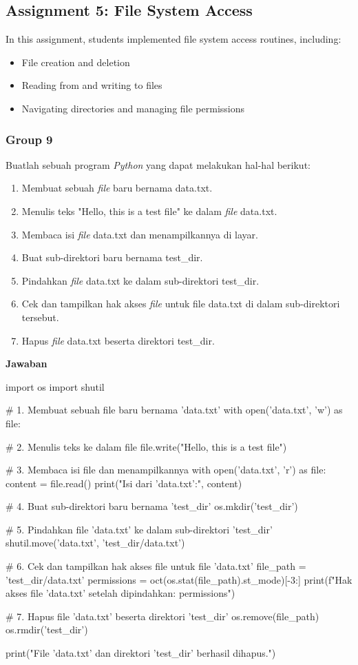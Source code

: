 \documentclass[12pt]{article}
\begin{document}
\subsection{Assignment 5: File System Access}
In this assignment, students implemented file system access routines, including:
\begin{itemize}
    \item File creation and deletion
    \item Reading from and writing to files
    \item Navigating directories and managing file permissions
\end{itemize}

\subsubsection{Group 9}
Buatlah sebuah program \textit{Python} yang dapat melakukan hal-hal berikut:
\begin{enumerate}
    \item Membuat sebuah \textit{file} baru bernama data.txt.
    \item Menulis teks "Hello, this is a test file" ke dalam \textit{file} data.txt.
    \item Membaca isi \textit{file} data.txt dan menampilkannya di layar.
    \item Buat sub-direktori baru bernama test_dir.
    \item Pindahkan \textit{file} data.txt ke dalam sub-direktori test_dir.
    \item Cek dan tampilkan hak akses \textit{file} untuk file data.txt di dalam sub-direktori tersebut.
    \item Hapus \textit{file} data.txt beserta direktori test_dir.
\end{enumerate}

\textbf{Jawaban}
\begin{python}
import os
import shutil

# 1. Membuat sebuah file baru bernama 'data.txt'
with open('data.txt', 'w') as file:

# 2. Menulis teks ke dalam file
file.write("Hello, this is a test file")

# 3. Membaca isi file dan menampilkannya
with open('data.txt', 'r') as file:
content = file.read()
print("Isi dari 'data.txt':", content)

# 4. Buat sub-direktori baru bernama 'test_dir'
os.mkdir('test_dir')

# 5. Pindahkan file 'data.txt' ke dalam sub-direktori 'test_dir'
shutil.move('data.txt', 'test_dir/data.txt')

# 6. Cek dan tampilkan hak akses file untuk file 'data.txt'
file_path = 'test_dir/data.txt'
permissions = oct(os.stat(file_path).st_mode)[-3:]
print(f"Hak akses file 'data.txt' setelah dipindahkan: {permissions}")

# 7. Hapus file 'data.txt' beserta direktori 'test_dir'
os.remove(file_path)
os.rmdir('test_dir')

print("File 'data.txt' dan direktori 'test_dir' berhasil dihapus.")

\end{python}
\end{document}
